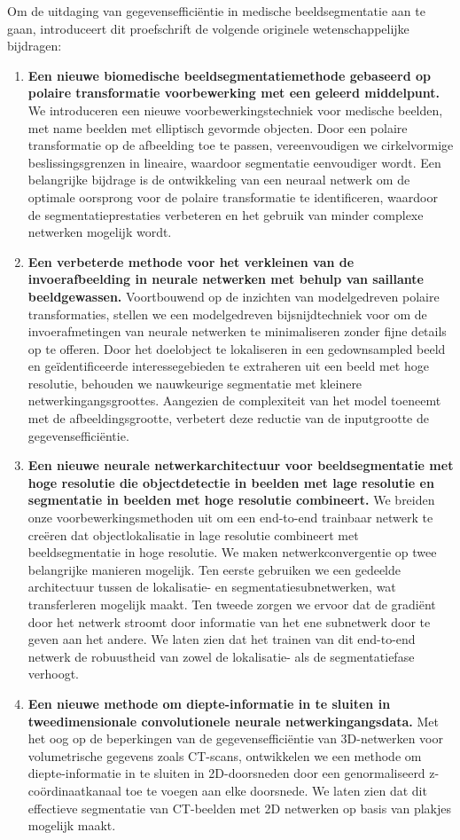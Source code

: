 Om de uitdaging van gegevensefficiëntie in medische beeldsegmentatie aan te gaan, introduceert dit proefschrift de volgende originele wetenschappelijke bijdragen:

\begin{enumerate}
	\item \textbf{Een nieuwe biomedische beeldsegmentatiemethode gebaseerd op polaire transformatie voorbewerking met een geleerd middelpunt.} We introduceren een nieuwe voorbewerkingstechniek voor medische beelden, met name beelden met elliptisch gevormde objecten. Door een polaire transformatie op de afbeelding toe te passen, vereenvoudigen we cirkelvormige beslissingsgrenzen in lineaire, waardoor segmentatie eenvoudiger wordt. Een belangrijke bijdrage is de ontwikkeling van een neuraal netwerk om de optimale oorsprong voor de polaire transformatie te identificeren, waardoor de segmentatieprestaties verbeteren en het gebruik van minder complexe netwerken mogelijk wordt.
	\item \textbf{Een verbeterde methode voor het verkleinen van de invoerafbeelding in neurale netwerken met behulp van saillante beeldgewassen.} Voortbouwend op de inzichten van modelgedreven polaire transformaties, stellen we een modelgedreven bijsnijdtechniek voor om de invoerafmetingen van neurale netwerken te minimaliseren zonder fijne details op te offeren. Door het doelobject te lokaliseren in een gedownsampled beeld en geïdentificeerde interessegebieden te extraheren uit een beeld met hoge resolutie, behouden we nauwkeurige segmentatie met kleinere netwerkingangsgroottes. Aangezien de complexiteit van het model toeneemt met de afbeeldingsgrootte, verbetert deze reductie van de inputgrootte de gegevensefficiëntie.
	\item \textbf{Een nieuwe neurale netwerkarchitectuur voor beeldsegmentatie met hoge resolutie die objectdetectie in beelden met lage resolutie en segmentatie in beelden met hoge resolutie combineert.} We breiden onze voorbewerkingsmethoden uit om een end-to-end trainbaar netwerk te creëren dat objectlokalisatie in lage resolutie combineert met beeldsegmentatie in hoge resolutie. We maken netwerkconvergentie op twee belangrijke manieren mogelijk. Ten eerste gebruiken we een gedeelde architectuur tussen de lokalisatie- en segmentatiesubnetwerken, wat transferleren mogelijk maakt. Ten tweede zorgen we ervoor dat de gradiënt door het netwerk stroomt door informatie van het ene subnetwerk door te geven aan het andere. We laten zien dat het trainen van dit end-to-end netwerk de robuustheid van zowel de lokalisatie- als de segmentatiefase verhoogt.
	\item \textbf{Een nieuwe methode om diepte-informatie in te sluiten in tweedimensionale convolutionele neurale netwerkingangsdata.} Met het oog op de beperkingen van de gegevensefficiëntie van 3D-netwerken voor volumetrische gegevens zoals CT-scans, ontwikkelen we een methode om diepte-informatie in te sluiten in 2D-doorsneden door een genormaliseerd z-coördinaatkanaal toe te voegen aan elke doorsnede. We laten zien dat dit effectieve segmentatie van CT-beelden met 2D netwerken op basis van plakjes mogelijk maakt.
\end{enumerate}

